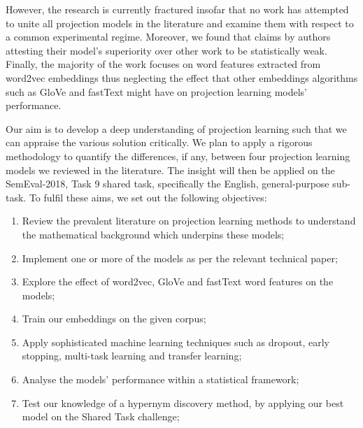 However, the research is currently fractured insofar that no work has attempted to unite all projection models in the literature and examine them with respect to a common experimental regime.  Moreover, we found that claims by authors attesting their model's superiority over other work to be statistically weak. Finally, the majority of the work focuses on word features extracted from word2vec embeddings thus neglecting the effect that other embeddings algorithms such as GloVe and fastText might have on projection learning models' performance.

Our aim is to develop a deep understanding of projection learning such that we can appraise the various solution critically.  We plan to apply a rigorous methodology to quantify the differences, if any, between four projection learning models we reviewed in the literature.  The insight will then be applied on the SemEval-2018, Task 9 shared task, specifically the English, general-purpose sub-task.  To fulfil these aims, we set out the following objectives:
\begin{enumerate}
    \item Review the prevalent literature on projection learning methods to understand the mathematical background which underpins these models;
    \item Implement one or more of the models as per the relevant technical paper;
    \item Explore the effect of word2vec, GloVe and fastText word features on the models;
    \item Train our embeddings on the given corpus;
    \item Apply sophisticated machine learning techniques such as dropout, early stopping, multi-task learning and transfer learning;
    \item Analyse the models' performance within a statistical framework;
    \item Test our knowledge of a hypernym discovery method, by applying our best model on the Shared Task challenge;
\end{enumerate}

